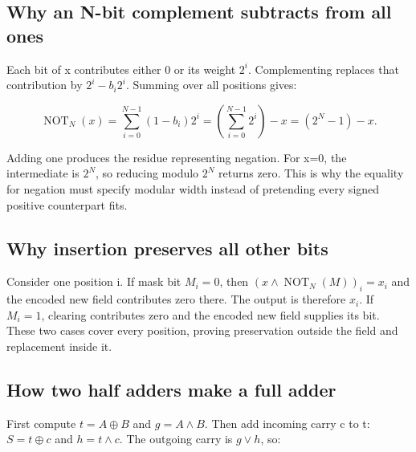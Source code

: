 \hypertarget{01-foundations-i-ch011-definitions-and-proof-steps-behind-the-compact-equations}{}

\subsection{Why an N-bit complement subtracts from all ones}\label{01-foundations-i-ch011-why-an-n-bit-complement-subtracts-from-all-ones}

\hypertarget{01-foundations-i-ch011-why-an-n-bit-complement-subtracts-from-all-ones}{}

Each bit of x contributes either 0 or its weight \(2^i\). Complementing replaces that contribution by \(2^i-b_i2^i\). Summing over all positions gives:

\[
\operatorname{NOT}_N(x)=\sum_{i=0}^{N-1}(1-b_i)2^i
=\left(\sum_{i=0}^{N-1}2^i\right)-x=(2^N-1)-x.
\]

Adding one produces the residue representing negation. For x=0, the intermediate is \(2^N\), so reducing modulo \(2^N\) returns zero. This is why the equality for negation must specify modular width instead of pretending every signed positive counterpart fits.

\subsection{Why insertion preserves all other bits}\label{01-foundations-i-ch011-why-insertion-preserves-all-other-bits}

\hypertarget{01-foundations-i-ch011-why-insertion-preserves-all-other-bits}{}

Consider one position i. If mask bit \(M_i=0\), then \((x\land\operatorname{NOT}_N(M))_i=x_i\) and the encoded new field contributes zero there. The output is therefore \(x_i\). If \(M_i=1\), clearing contributes zero and the encoded new field supplies its bit. These two cases cover every position, proving preservation outside the field and replacement inside it.

\subsection{How two half adders make a full adder}\label{01-foundations-i-ch011-how-two-half-adders-make-a-full-adder}

\hypertarget{01-foundations-i-ch011-how-two-half-adders-make-a-full-adder}{}

First compute \(t=A\oplus B\) and \(g=A\land B\). Then add incoming carry c to t: \(S=t\oplus c\) and \(h=t\land c\). The outgoing carry is \(g\lor h\), so:

